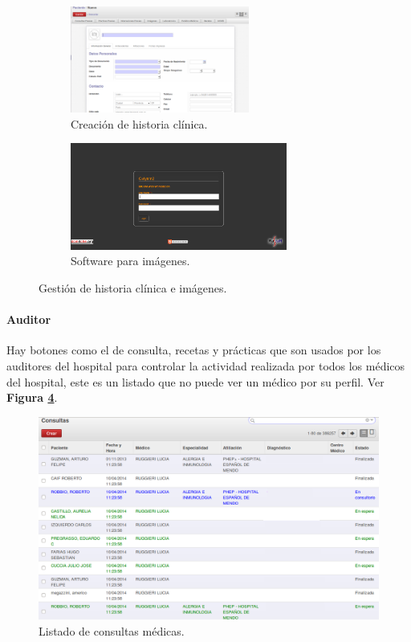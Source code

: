 \begin{figure}[h]
      \centering
      \begin{subfigure}[t]{0.48\textwidth}
        \includegraphics[height=3.5cm]{img/tp1/HE/HCUD2}
        \caption{Creación de historia clínica.}
        \label{hc-nueva}
      \end{subfigure}
      \hfill%
      \begin{subfigure}[t]{0.48\textwidth}
        \includegraphics[height=3.5cm]{img/tp1/HE/Imagenes}
        \caption{Software para imágenes.}
        \label{sw-imagen}
	  \end{subfigure}
	  \caption{Gestión de historia clínica e imágenes.}
\end{figure}


\paragraph{Auditor}

Hay botones como el de consulta, recetas y prácticas que son usados por los auditores del hospital para controlar la actividad realizada por todos los médicos del hospital, este es un listado que no puede ver un médico por su perfil. Ver \textbf{Figura \ref{consultas-auditor}}.


\begin{figure}[h]
      \centering
      \includegraphics[width=.8\textwidth]{img/tp1/HE/HCUDConsulta}
      \caption{Listado de consultas médicas.}
      \label{consultas-auditor}
\end{figure}



